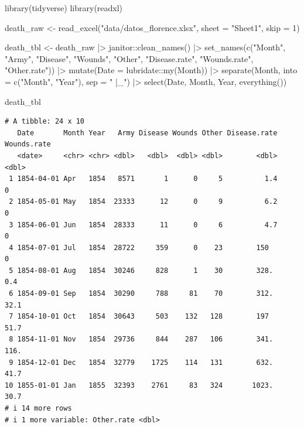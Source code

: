 \documentclass[
  letterpaper,
  chapter,a4paper,showtrims,openright,hidelinks]{oblivoir}
\newenvironment{Shaded}{\begin{snugshade}}{\end{snugshade}}
\newcommand{\AttributeTok}[1]{\textcolor[rgb]{0.40,0.45,0.13}{#1}}
\newcommand{\DecValTok}[1]{\textcolor[rgb]{0.68,0.00,0.00}{#1}}
\newcommand{\FunctionTok}[1]{\textcolor[rgb]{0.28,0.35,0.67}{#1}}
\newcommand{\NormalTok}[1]{\textcolor[rgb]{0.00,0.23,0.31}{#1}}
\newcommand{\OtherTok}[1]{\textcolor[rgb]{0.00,0.23,0.31}{#1}}
\newcommand{\SpecialCharTok}[1]{\textcolor[rgb]{0.37,0.37,0.37}{#1}}
\newcommand{\StringTok}[1]{\textcolor[rgb]{0.13,0.47,0.30}{#1}}
\begin{document}
\begin{Shaded}
\begin{Highlighting}[]
\FunctionTok{library}\NormalTok{(tidyverse)}
\FunctionTok{library}\NormalTok{(readxl)}

\NormalTok{death\_raw }\OtherTok{\textless{}{-}} \FunctionTok{read\_excel}\NormalTok{(}\StringTok{"data/datos\_florence.xlsx"}\NormalTok{, }\AttributeTok{sheet =} \StringTok{"Sheet1"}\NormalTok{, }\AttributeTok{skip =} \DecValTok{1}\NormalTok{)}

\NormalTok{death\_tbl }\OtherTok{\textless{}{-}}\NormalTok{ death\_raw }\SpecialCharTok{|\textgreater{}} 
\NormalTok{  janitor}\SpecialCharTok{::}\FunctionTok{clean\_names}\NormalTok{() }\SpecialCharTok{|\textgreater{}} 
  \FunctionTok{set\_names}\NormalTok{(}\FunctionTok{c}\NormalTok{(}\StringTok{"Month"}\NormalTok{, }\StringTok{"Army"}\NormalTok{, }\StringTok{"Disease"}\NormalTok{, }\StringTok{"Wounds"}\NormalTok{, }\StringTok{"Other"}\NormalTok{, }\StringTok{"Disease.rate"}\NormalTok{, }\StringTok{"Wounds.rate"}\NormalTok{, }\StringTok{"Other.rate"}\NormalTok{)) }\SpecialCharTok{|\textgreater{}} 
  \FunctionTok{mutate}\NormalTok{(}\AttributeTok{Date =}\NormalTok{ lubridate}\SpecialCharTok{::}\FunctionTok{my}\NormalTok{(Month)) }\SpecialCharTok{|\textgreater{}} 
  \FunctionTok{separate}\NormalTok{(Month, }\AttributeTok{into =} \FunctionTok{c}\NormalTok{(}\StringTok{"Month"}\NormalTok{, }\StringTok{"Year"}\NormalTok{), }\AttributeTok{sep =} \StringTok{" |\_"}\NormalTok{) }\SpecialCharTok{|\textgreater{}} 
  \FunctionTok{select}\NormalTok{(Date, Month, Year, }\FunctionTok{everything}\NormalTok{()) }

\NormalTok{death\_tbl}
\end{Highlighting}
\end{Shaded}

\begin{verbatim}
# A tibble: 24 x 10
   Date       Month Year   Army Disease Wounds Other Disease.rate Wounds.rate
   <date>     <chr> <chr> <dbl>   <dbl>  <dbl> <dbl>        <dbl>       <dbl>
 1 1854-04-01 Apr   1854   8571       1      0     5          1.4         0  
 2 1854-05-01 May   1854  23333      12      0     9          6.2         0  
 3 1854-06-01 Jun   1854  28333      11      0     6          4.7         0  
 4 1854-07-01 Jul   1854  28722     359      0    23        150           0  
 5 1854-08-01 Aug   1854  30246     828      1    30        328.          0.4
 6 1854-09-01 Sep   1854  30290     788     81    70        312.         32.1
 7 1854-10-01 Oct   1854  30643     503    132   128        197          51.7
 8 1854-11-01 Nov   1854  29736     844    287   106        341.        116. 
 9 1854-12-01 Dec   1854  32779    1725    114   131        632.         41.7
10 1855-01-01 Jan   1855  32393    2761     83   324       1023.         30.7
# i 14 more rows
# i 1 more variable: Other.rate <dbl>
\end{verbatim}
\end{document}
